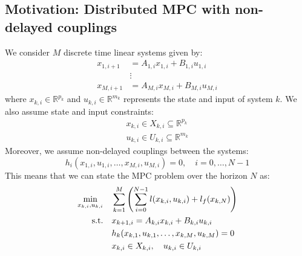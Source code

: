\subsection{Motivation: Distributed MPC with non-delayed couplings}
We consider $M$ discrete time linear systems given by:
\begin{subequations}
\begin{align}
x_{1,i+1} & = A_{1,i} x_{1,i} + B_{1,i} u_{1,i} \\
& \vdots \\
x_{M,i+1} & = A_{M,i} x_{M,i} + B_{M,i} u_{M,i} 
\end{align}
\end{subequations}
where $x_{k,i} \in \mathbb{R}^{p_{k}}$ and $u_{k,i} \in \mathbb{R}^{m_{k}}$ represents the state and input of system $k$. We also assume state and input constraints:
\begin{subequations}
\begin{align}
x_{k,i} \in X_{k,i} \subseteq \mathbb{R}^{p_{k}} \\
u_{k,i} \in U_{k,i} \subseteq \mathbb{R}^{m_{k}}
\end{align}
\end{subequations}
Moreover, we assume non-delayed couplings between the systems:
\begin{equation}
h_i(x_{1,i}, u_{1,i}, \dots, x_{M,i}, u_{M,i}) = 0, \quad i = 0,\dots,N-1
\end{equation}
This means that we can state the MPC problem over the horizon $N$ as:
\begin{subequations}
\begin{align}
\min_{x_{k,i}, u_{k,i}} & \quad \sum_{k=1}^{M} \left( \sum_{i=0}^{N-1} \mathnormal{l}(x_{k,i}, u_{k,i}) + \mathnormal{l}_f(x_{k,N}) \right) \label{e:MPCobjective} \\
\text{s.t.} & \quad x_{k+1,i} = A_{k,i}x_{k,i} + B_{k,i}u_{k,i} \\
& \quad h_k(x_{k,1}, u_{k,1}, \dots, x_{k,M}, u_{k,M}) = 0 \label{e:MPCcouplings} \\
& \quad x_{k,i} \in X_{k,i}, \quad u_{k,i} \in U_{k,i} \label{e:MPCconstrains}
\end{align}
\end{subequations}

